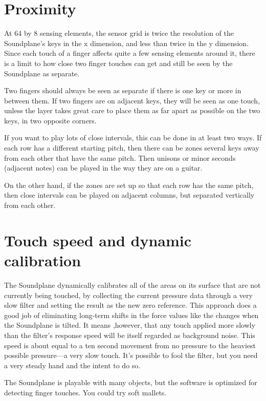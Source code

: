 \section{Proximity}

At 64 by 8 sensing elements, the sensor grid is twice the resolution of the Soundplane’s keys in the x dimension, and less than twice in the y dimension.  Since each touch of a finger affects quite a few sensing elements around it, there is a limit to how close two finger touches can get and still be seen by the Soundplane as separate.  

Two fingers should always be seen as separate if there is one key or more in between them.  If two fingers are on adjacent keys, they will be seen as one touch, unless the layer takes great care to place them as far apart as possible on the two keys, in two opposite corners.  

If you want to play lots of close intervals, this can be done in at least two ways.  If each row has a different starting pitch, then there can be zones several keys away from each other that have the same pitch.  Then unisons or minor seconds (adjacent notes) can be played in the way they are on a guitar. 

On the other hand, if the zones are set up so that each row has the same pitch, then close intervals can be played on adjacent columns, but separated vertically from each other.  

 

\section{Touch speed and dynamic calibration}


The Soundplane dynamically calibrates all of the areas on its surface that are not currently being touched, by collecting the current pressure data through a very slow filter and setting the result as the new zero reference.   This approach does a good job of eliminating long-term shifts in the force values like the changes when the Soundplane is tilted.  It means ,however, that any touch applied more slowly than the filter's response speed will be itself regarded as background noise.  This speed is about equal to a ten second movement from no pressure to the heaviest possible pressure—a very slow touch.  It's possible to fool the filter, but you need a very steady hand and the intent to do so.  

The Soundplane is playable with many objects, but the software is optimized for detecting finger touches.  You could try soft mallets. 
 

